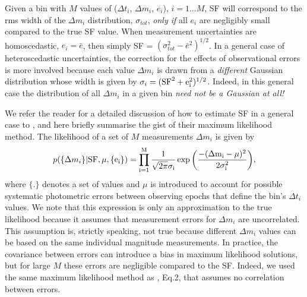 \documentclass[fleqn,usenatbib]{mnras}
\begin{document}
Given a bin with $M$ values of ($\Delta t_i$, $\Delta m_i$, $e_i$), $i=1...M$, SF will correspond to the rms width
of the $\Delta m_i$ distribution, $\sigma_{tot}$, {\it only if} all $e_i$ are negligibly small compared to the true SF 
value. When measurement uncertainties are homoscedastic, $e_i = \bar{e}$, then simply SF = $(\sigma_{tot}^2
- \bar{e}^2)^{1/2}$. In a general case of heteroscedastic uncertainties, the correction for the effects of 
observational errors is more involved because each value $\Delta m_i$ is drawn from a {\it different}
Gaussian distribution whose width is given by $\sigma_i  = (\rm{SF}^2 + e_i^2)^{1/2}$. Indeed, in this general 
case the distribution of all $\Delta m_i$ in a given bin {\it need not be a Gaussian at all!}

We refer the reader for a detailed discussion of how to estimate SF in a general case to \cite{ivezic2014}, 
and here briefly summarise the gist of their maximum likelihood method. The likelihood of a set of $M$
measurements $\Delta m_i$ is given by 
\begin{equation}
\label{eq:L}
p(\{\Delta m_{i}\} | \rm{SF}, \mu, \{e_{i}\} ) = 
 \prod _{i=1}^{M} { \frac{1}{\sqrt{2\pi} \sigma_i} \exp{\left( \frac{-(\Delta m_{i}-\mu)^{2}}{2\sigma_i^{2}} \right)}},
\end{equation}
where $\{.\}$ denotes a set of values and $\mu$ is introduced to account for possible systematic photometric 
errors between observing epochs that define the bin's $\Delta t_i$ values. We note that this expression is only 
an approximation to the true likelihood because it assumes that measurement errors for $\Delta m_i$ are 
uncorrelated. This assumption is, strictly speaking, not true because different $\Delta m_i$ values can be 
based on the same individual magnitude measurements. In practice, the covariance between errors can introduce a bias in maximum likelihood solutions, but for large $M$ these errors are negligible compared to the SF. Indeed, we used the same maximum likelihood method as \cite{schmidt2010}, Eq.2, that assumes no correlation between errors. 
\end{document}
